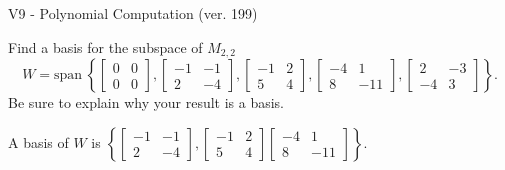 \begin{exercise}
  \begin{exerciseTitle}V9 - Polynomial Computation (ver. 199)\end{exerciseTitle}
  \begin{exerciseStatement}
    Find a basis for the subspace of \(M_{2,2}\) 
\[W=\mathrm{span}\ \left\{\left[\begin{array}{cc}
0 & 0 \\
0 & 0
\end{array}\right] , \left[\begin{array}{cc}
-1 & -1 \\
2 & -4
\end{array}\right] , \left[\begin{array}{cc}
-1 & 2 \\
5 & 4
\end{array}\right] , \left[\begin{array}{cc}
-4 & 1 \\
8 & -11
\end{array}\right] , \left[\begin{array}{cc}
2 & -3 \\
-4 & 3
\end{array}\right]\right\}.\]
 Be sure to explain why your result is a basis.


  \end{exerciseStatement}
  \begin{exerciseAnswer}
   A basis of \(W\) is  \(\left\{\left[\begin{array}{cc}
-1 & -1 \\
2 & -4
\end{array}\right] , \left[\begin{array}{cc}
-1 & 2 \\
5 & 4
\end{array}\right] \left[\begin{array}{cc}
-4 & 1 \\
8 & -11
\end{array}\right]\right\}\).
  


  \end{exerciseAnswer}
\end{exercise}